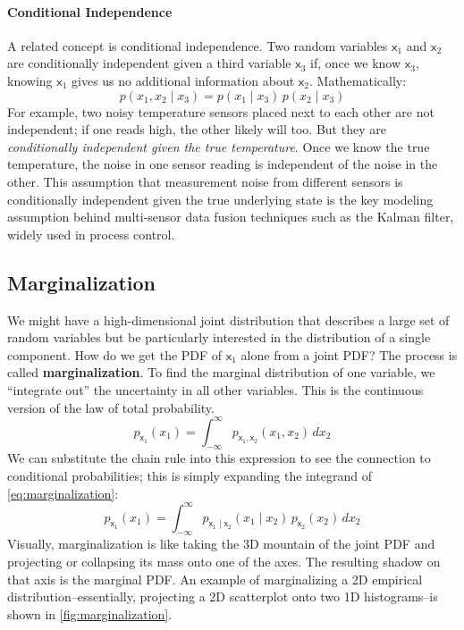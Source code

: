 \paragraph*{Conditional Independence}
A related concept is conditional independence. Two random variables $\mathsf{x}_1$ and $\mathsf{x}_2$ are conditionally independent given a third variable $\mathsf{x}_3$ if, once we know $\mathsf{x}_3$, knowing $\mathsf{x}_1$ gives us no additional information about $\mathsf{x}_2$. Mathematically:
\begin{equation}
    p(x_1, x_2 \mid x_3) = p(x_1 \mid x_3)\,p(x_2 \mid x_3)
\end{equation}
For example, two noisy temperature sensors placed next to each other are not independent; if one reads high, the other likely will too. But they are \textit{conditionally independent given the true temperature}. Once we know the true temperature, the noise in one sensor reading is independent of the noise in the other. This assumption that measurement noise from different sensors is conditionally independent given the true underlying state is the key modeling assumption behind multi-sensor data fusion techniques such as the Kalman filter, widely used in process control.

\subsection{Marginalization}
We might have a high-dimensional joint distribution that describes a large set of random variables but be particularly interested in the distribution of a single component. How do we get the PDF of $\mathsf{x}_1$ alone from a joint PDF? The process is called \textbf{marginalization}. To find the marginal distribution of one variable, we ``integrate out'' the uncertainty in all other variables. This is the continuous version of the law of total probability.
\begin{equation}
    p_{\mathsf{x}_1}(x_1) = \int_{-\infty}^{\infty} p_{\mathsf{x}_1, \mathsf{x}_2}(x_1, x_2)\,dx_2
    \label{eq:marginalization}
\end{equation}
We can substitute the chain rule into this expression to see the connection to conditional probabilities; this is simply expanding the integrand of \autoref{eq:marginalization}:
\begin{equation}
    p_{\mathsf{x}_1}(x_1) = \int_{-\infty}^{\infty} p_{\mathsf{x}_1 \mid \mathsf{x}_2}(x_1 \mid x_2)\,p_{\mathsf{x}_2}(x_2)\,dx_2
\end{equation}
Visually, marginalization is like taking the 3D mountain of the joint PDF and projecting or collapsing its mass onto one of the axes. The resulting shadow on that axis is the marginal PDF. An example of marginalizing a 2D empirical distribution--essentially, projecting a 2D scatterplot onto two 1D histograms--is shown in \autoref{fig:marginalization}.

